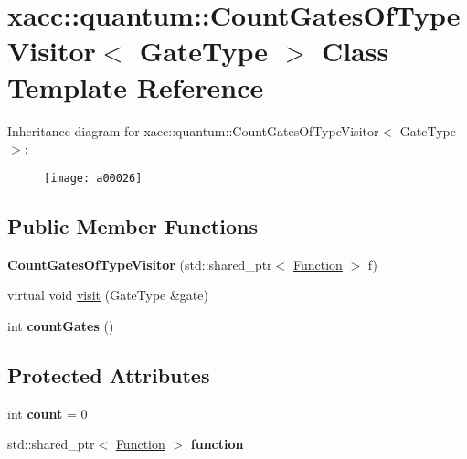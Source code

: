 \hypertarget{a00026}{}\section{xacc\+:\+:quantum\+:\+:Count\+Gates\+Of\+Type\+Visitor$<$ Gate\+Type $>$ Class Template Reference}
\label{a00026}
Inheritance diagram for xacc\+:\+:quantum\+:\+:Count\+Gates\+Of\+Type\+Visitor$<$ Gate\+Type $>$\+:\begin{figure}[H]
\begin{center}
\leavevmode
\texttt{[image: a00026]}
\end{center}
\end{figure}
\subsection*{Public Member Functions}
\begin{DoxyCompactItemize}
\item 
{\bfseries Count\+Gates\+Of\+Type\+Visitor} (std\+::shared\+\_\+ptr$<$ \hyperlink{a00038}{Function} $>$ f)\hypertarget{a00026_a4c2507e3ee4fe51e7ff4501bf5569cfc}{}\label{a00026_a4c2507e3ee4fe51e7ff4501bf5569cfc}

\item 
virtual void \hyperlink{a00026_a9c40e6cb4b74e2d6714c531ffc3b2909}{visit} (Gate\+Type \&gate)
\item 
int {\bfseries count\+Gates} ()\hypertarget{a00026_a8a1a17ed50cd6727c2eb07976f886389}{}\label{a00026_a8a1a17ed50cd6727c2eb07976f886389}

\end{DoxyCompactItemize}
\subsection*{Protected Attributes}
\begin{DoxyCompactItemize}
\item 
int {\bfseries count} = 0\hypertarget{a00026_ae3d8ae4c40c1552ee68aa6e5002e42bd}{}\label{a00026_ae3d8ae4c40c1552ee68aa6e5002e42bd}

\item 
std\+::shared\+\_\+ptr$<$ \hyperlink{a00038}{Function} $>$ {\bfseries function}\hypertarget{a00026_a202ab6e0e365af735da706fe972333e7}{}\label{a00026_a202ab6e0e365af735da706fe972333e7}

\end{DoxyCompactItemize}


